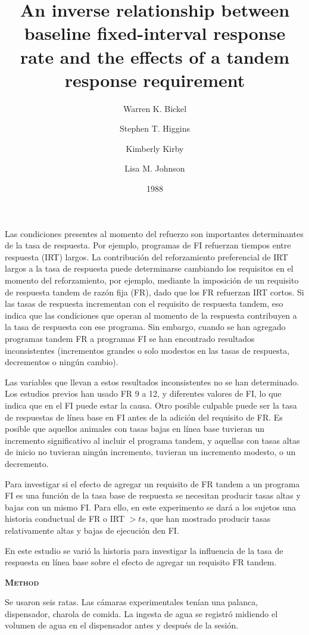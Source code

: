 \documentclass[a4paper,12pt]{article}
\title{An inverse relationship between baseline fixed-interval response rate and the effects of a tandem response requirement}
\author{Warren K. Bickel \and Stephen T. Higgins \and Kimberly Kirby \and Lisa M. Johnson}
\date{1988}
\begin{document}
{\scshape\bfseries \maketitle}

Las condiciones presentes al momento del refuerzo son importantes determinantes de la tasa de respuesta. Por ejemplo, programas de FI refuerzan tiempos entre respuesta (IRT) largos. La contribución del reforzamiento preferencial de IRT largos a la tasa de respuesta puede determinarse cambiando los requisitos en el momento del reforzamiento, por ejemplo, mediante la imposición de un requisito de respuesta tandem de razón fija (FR), dado que los FR refuerzan IRT cortos. Si las tasas de respuesta incrementan con el requisito de respuesta tandem, eso indica que las condiciones que operan al momento de la respuesta contribuyen a la tasa de respuesta con ese programa. Sin embargo, cuando se han agregado programas tandem FR a programas FI se han encontrado resultados inconsistentes (incrementos grandes o solo modestos en las tasas de respuesta, decrementos o ningún cambio).

Las variables que llevan a estos resultados inconsistentes no se han determinado. Los estudios previos han usado FR 9 a 12, y diferentes valores de FI, lo que indica que en el FI puede estar la causa. Otro posible culpable puede ser la tasa de respuestas de línea base en FI antes de la adición del requisito de FR. Es posible que aquellos animales con tasas bajas en línea base tuvieran un incremento significativo al incluir el programa tandem, y aquellas con tasas altas de inicio no tuvieran ningún incremento, tuvieran un incremento modesto, o un decremento.

Para investigar si el efecto de agregar un requisito de FR tandem a un programa FI es una función de la tasa base de respuesta se necesitan producir tasas altas y bajas con un mismo FI. Para ello, en este experimento se dará a los sujetos una historia conductual de FR o IRT $> ts$, que han mostrado producir tasas relativamente altas y bajas de ejecución den FI.

En este estudio se varió la historia para investigar la influencia de la tasa de respuesta en línea base sobre el efecto de agregar un requisito FR tandem.

{\scshape\bfseries Method}

Se usaron seis ratas. Las cámaras experimentales tenían una palanca, dispensador, charola de comida. La ingesta de agua se registró midiendo el volumen de agua en el dispensador antes y después de la sesión.
\end{document}
